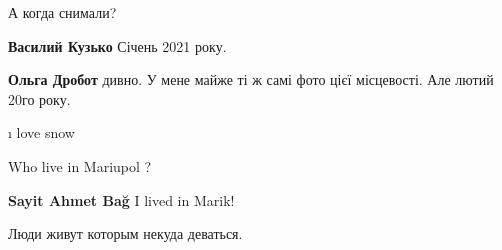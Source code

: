  
 
 
 
 

\qqSecCmt


А когда снимали?

\textbf{Василий Кузько} Січень 2021 року.

\textbf{Ольга Дробот} дивно. У мене майже ті ж самі фото цієї місцевості. Але лютий 20го року.

ı love snow

Who live in Mariupol ?

\begin{itemize} %
\textbf{Sayit Ahmet Bağ}
I lived in Marik!

Люди живут которым некуда деваться.
\end{itemize} %
